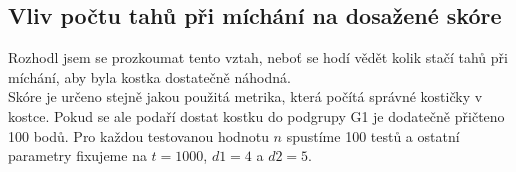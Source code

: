 \documentclass{article}
\begin{document}
\subsection*{Vliv počtu tahů při míchání na dosažené skóre}
Rozhodl jsem se prozkoumat tento vztah, neboť se hodí vědět kolik stačí tahů při míchání, aby byla kostka
dostatečně náhodná. \\
Skóre je určeno stejně jakou použitá metrika, která počítá správné kostičky v kostce.
Pokud se ale podaří dostat kostku do podgrupy G1 je dodatečně přičteno 100 bodů.
Pro každou testovanou hodnotu $n$ spustíme 100 testů a ostatní parametry fixujeme na
$t = 1000$, $d1 = 4$ a $d2 = 5$.
\end{document}
